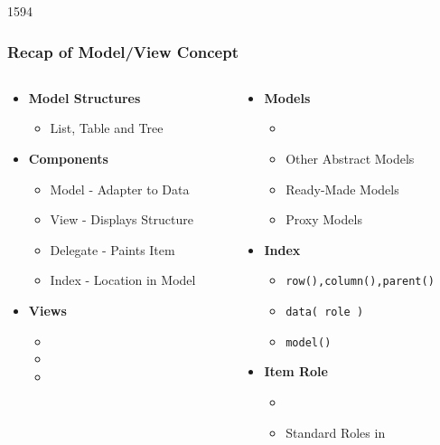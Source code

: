\begin{slide}{1594}\frametitle{Recap of Model/View Concept}
\begin{columns}
  \begin{column}{50mm}
    \begin{itemize}
    \item \textbf{Model Structures}
      \begin{itemize}
      \item List, Table and Tree
      \end{itemize}
    \item \textbf{Components}
      \begin{itemize}
      \item Model - Adapter to Data
      \item View - Displays Structure
      \item Delegate - Paints Item
      \item Index - Location in Model
      \end{itemize}
    \item \textbf{Views}
      \begin{itemize}
      \item {}
      \item {}
      \item {}
      \end{itemize}
    \end{itemize}
  \end{column}
  \begin{column}{55mm}
    \begin{itemize}
    \item \textbf{Models}
      \begin{itemize}
      \item {}
      \item Other Abstract Models
      \item Ready-Made Models
      \item Proxy Models
      \end{itemize}
    \item \textbf{Index}
      \begin{itemize}
      \item \texttt{row(),column(),parent()}
      \item \texttt{data( role )}
      \item \texttt{model()}
      \end{itemize}
    \item \textbf{Item Role}
      \begin{itemize}
      \item {}
      \item Standard Roles in 
      \end{itemize}
   \end{itemize}
  \end{column}
\end{columns}
\end{slide}



